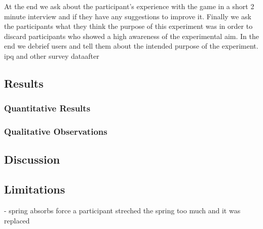 At the end we ask about the participant’s experience with the game in a short 2 minute interview and if they have any suggestions to improve it. Finally we ask the participants what they think the purpose of this experiment was in order to discard participants who showed a high awareness of the experimental aim. In the end we debrief users and tell them about the intended purpose of the experiment.
 ipq and other survey dataafter
\subsection{Results}
\subsubsection{Quantitative Results}
\subsubsection{Qualitative Observations}


\subsection{Discussion}

\subsection{Limitations}
- spring absorbs force a participant streched the spring too much and it was replaced